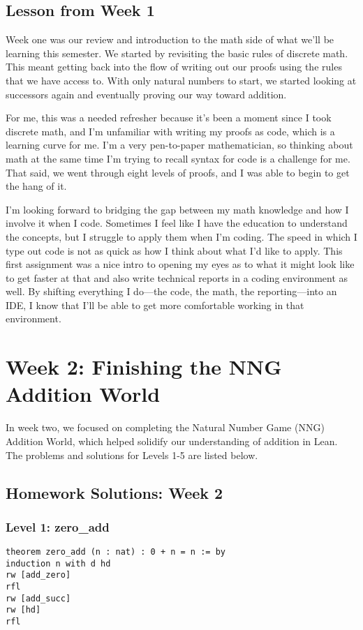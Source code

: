 \documentclass{article}
\begin{document}
\subsection*{Lesson from Week 1}
Week one was our review and introduction to the math side of what we'll be learning this semester. We started by revisiting the basic rules of discrete math. This meant getting back into the flow of writing out our proofs using the rules that we have access to. With only natural numbers to start, we started looking at successors again and eventually proving our way toward addition.

For me, this was a needed refresher because it's been a moment since I took discrete math, and I'm unfamiliar with writing my proofs as code, which is a learning curve for me. I'm a very pen-to-paper mathematician, so thinking about math at the same time I'm trying to recall syntax for code is a challenge for me. That said, we went through eight levels of proofs, and I was able to begin to get the hang of it.

I'm looking forward to bridging the gap between my math knowledge and how I involve it when I code. Sometimes I feel like I have the education to understand the concepts, but I struggle to apply them when I'm coding. The speed in which I type out code is not as quick as how I think about what I'd like to apply. This first assignment was a nice intro to opening my eyes as to what it might look like to get faster at that and also write technical reports in a coding environment as well. By shifting everything I do—the code, the math, the reporting—into an IDE, I know that I'll be able to get more comfortable working in that environment.

\section{Week 2: Finishing the NNG Addition World}
\label{sec:week2}

In week two, we focused on completing the Natural Number Game (NNG) Addition World, which helped solidify our understanding of addition in Lean. The problems and solutions for Levels 1-5 are listed below.

\subsection*{Homework Solutions: Week 2}

\subsubsection*{Level 1: zero\_add}
\begin{lstlisting}[style=leanstyle]
theorem zero_add (n : nat) : 0 + n = n := by
induction n with d hd
rw [add_zero]
rfl
rw [add_succ]
rw [hd]
rfl
\end{lstlisting}
\end{document}

